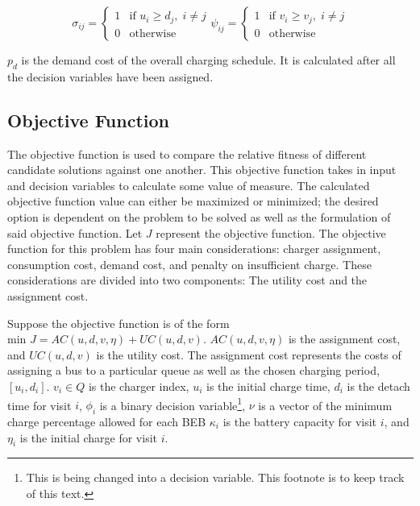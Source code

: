 \documentclass[11pt,a4paper,final]{article}
\newcommand{\AC}{AC(u, d, v, \eta)}         %
\newcommand{\UC}{UC(u, d, v)}               %
\newcommand{\Qset}{Q}                       %
\begin{document}
\begin{subequations}
\label{eq:bus-spat-temp}
\begin{equation}
  \sigma_{ij} =
  \begin{cases}
    1 & \text{if } u_i \ge d_j, \; i \ne j\\
    0 & \text{otherwise}
  \end{cases}
\end{equation}

\begin{equation}
  \psi_{ij} =
  \begin{cases}
    1 & \text{if } v_i \ge v_j,\; i \ne j\\
    0 & \text{otherwise}
  \end{cases}
\end{equation}
\end{subequations}

\(p_d\) is the demand cost of the overall charging schedule. It is calculated after all the decision variables have been
assigned.

\subsection{Objective Function}
\label{sec:objective-function}
The objective function is used to compare the relative fitness of different candidate solutions against one another.
This objective function takes in input and decision variables to calculate some value of measure. The calculated
objective function value can either be maximized or minimized; the desired option is dependent on the problem to be
solved as well as the formulation of said objective function. Let \(J\) represent the objective function. The objective
function for this problem has four main considerations: charger assignment, consumption cost, demand cost, and penalty
on insufficient charge. These considerations are divided into two components: The utility cost and the assignment cost.

Suppose the objective function is of the form \(\text{min } J = \AC + \UC\). \(\AC\) is the assignment cost, and \(\UC\) is
the utility cost. The assignment cost represents the costs of assigning a bus to a particular queue as well as the
chosen charging period, \([u_i, d_i]\). \(v_i \in \Qset\) is the charger index, \(u_i\) is the initial charge time, \(d_i\) is the
detach time for visit \(i\), \(\phi_i\) is a binary decision variable\footnote{This is being changed into a decision variable. This footnote is to keep track of this text.}, \(\nu\) is a vector of the minimum charge percentage
allowed for each BEB \(\kappa_i\) is the battery capacity for visit \(i\), and \(\eta_i\) is the initial charge for visit \(i\).
\end{document}
